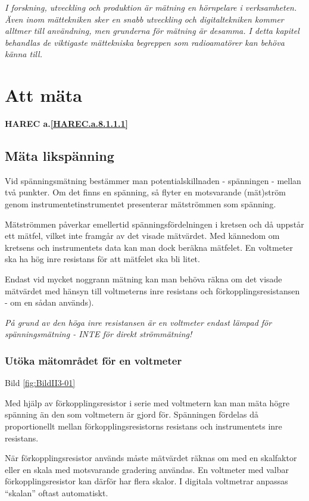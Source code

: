 \emph{I forskning, utveckling och produktion är mätning en hörnpelare
  i verksamheten. Även inom mättekniken sker en snabb utveckling och
  digitaltekniken kommer alltmer till användning, men grunderna för
  mätning är desamma. I detta kapitel behandlas de viktigaste
  mättekniska begreppen som radioamatörer kan behöva känna till.}

\section{Att mäta}
\textbf{
HAREC a.\ref{HAREC.a.8.1.1.1}\label{myHAREC.a.8.1.1.1}
}

\subsection{Mäta likspänning}

Vid spänningsmätning bestämmer man potentialskillnaden - spänningen -
mellan två punkter. Om det finns en spänning, så flyter en motsvarande
(mät)ström genom instrumentetinstrumentet presenterar mätströmmen som
spänning.

Mätströmmen påverkar emellertid spänningsfördelningen i kretsen och då
uppstår ett mätfel, vilket inte framgår av det visade mätvärdet. Med
kännedom om kretsens och instrumentets data kan man dock beräkna
mätfelet. En voltmeter ska ha hög inre resistans för att mätfelet
ska bli litet.

Endast vid mycket noggrann mätning kan man behöva räkna om det visade
mätvärdet med hänsyn till voltmeterns inre resistans och
förkopplingsresistansen - om en sådan används).

\emph{På grund av den höga inre resistansen är en voltmeter endast
  lämpad för spänningsmätning - INTE för direkt strömmätning!}

\subsubsection{Utöka mätområdet för en voltmeter}

Bild \ref{fig:BildII3-01}

Med hjälp av förkopplingsresistor i serie med voltmetern kan man mäta
högre spänning än den som voltmetern är gjord för.  Spänningen
fördelas då proportionellt mellan förkopplingsresistorns resistans och
instrumentets inre resistans.

När förkopplingsresistor används måste mätvärdet räknas om med en
skalfaktor eller en skala med motsvarande gradering användas. En
voltmeter med valbar förkopplingsresistor kan därför har flera
skalor. I digitala voltmetrar anpassas ``skalan'' oftast automatiskt.

